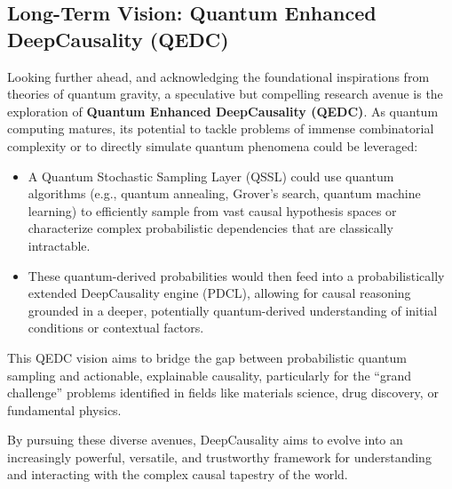 \subsection{Long-Term Vision: Quantum Enhanced DeepCausality (QEDC)}
\label{subsec:qedc}

Looking further ahead, and acknowledging the foundational inspirations from theories of quantum gravity, a speculative but compelling research avenue is the exploration of \textbf{Quantum Enhanced DeepCausality (QEDC)}. As quantum computing matures, its potential to tackle problems of immense combinatorial complexity or to directly simulate quantum phenomena could be leveraged:
\begin{itemize}
    \item A Quantum Stochastic Sampling Layer (QSSL) could use quantum algorithms (e.g., quantum annealing, Grover's search, quantum machine learning) to efficiently sample from vast causal hypothesis spaces or characterize complex probabilistic dependencies that are classically intractable.
    \item These quantum-derived probabilities would then feed into a probabilistically extended DeepCausality engine (PDCL), allowing for causal reasoning grounded in a deeper, potentially quantum-derived understanding of initial conditions or contextual factors.
\end{itemize}
This QEDC vision aims to bridge the gap between probabilistic quantum sampling and actionable, explainable causality, particularly for the ``grand challenge'' problems identified in fields like materials science, drug discovery, or fundamental physics.

By pursuing these diverse avenues, DeepCausality aims to evolve into an increasingly powerful, versatile, and trustworthy framework for understanding and interacting with the complex causal tapestry of the world.